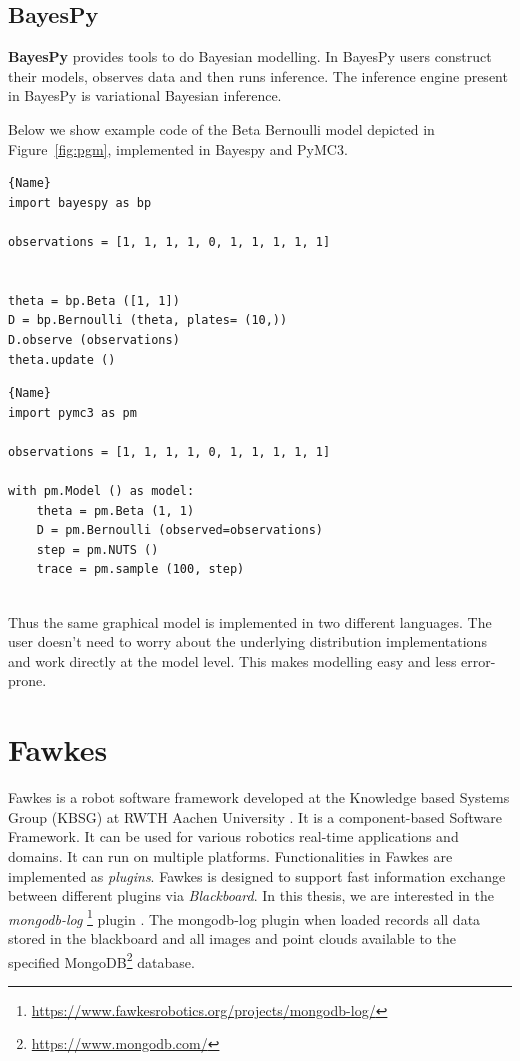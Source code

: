 \subsection{BayesPy}

\textbf{BayesPy} provides tools to do Bayesian modelling. In BayesPy users construct their models, observes data and then runs inference. The inference engine present in BayesPy is variational Bayesian inference.

Below we show example code of the Beta Bernoulli model depicted in Figure~\ref{fig:pgm}, implemented in Bayespy and PyMC3.

\noindent\begin{minipage}{.46\textwidth}
\begin{lstlisting}[caption=BayesPy Code,frame=tlrb]{Name}
import bayespy as bp

observations = [1, 1, 1, 1, 0, 1, 1, 1, 1, 1]


theta = bp.Beta ([1, 1])
D = bp.Bernoulli (theta, plates= (10,))
D.observe (observations)
theta.update ()

\end{lstlisting}
\end{minipage}\hfill
\begin{minipage}{.46\textwidth}
\begin{lstlisting}[caption=PyMC3 code,frame=tlrb]{Name}
import pymc3 as pm

observations = [1, 1, 1, 1, 0, 1, 1, 1, 1, 1]

with pm.Model () as model:
    theta = pm.Beta (1, 1)
    D = pm.Bernoulli (observed=observations)
    step = pm.NUTS () 
    trace = pm.sample (100, step)
    
\end{lstlisting}

\end{minipage}


Thus the same graphical model is implemented in two different languages. The user doesn't need to worry about the underlying distribution implementations and work directly at the model level. This makes modelling easy and less error-prone. 


\section{Fawkes}
Fawkes is a robot software framework developed at the Knowledge based Systems Group  (KBSG) at RWTH Aachen University \citep{niemueller2010design}. It is a component-based Software Framework. It can be used for various robotics real-time applications and domains. It can run on multiple platforms. Functionalities in Fawkes are implemented as \emph{plugins}. Fawkes is designed to support fast information exchange  between different plugins via \emph{Blackboard}. In this thesis, we are interested in the \emph{mongodb-log} \footnote{\url{https://www.fawkesrobotics.org/projects/mongodb-log/}} plugin \citep{niemueller2012generic}. The mongodb-log plugin when loaded records all data stored in the blackboard  and all images and point clouds available to the specified MongoDB\footnote{\url{https://www.mongodb.com/}} database. 